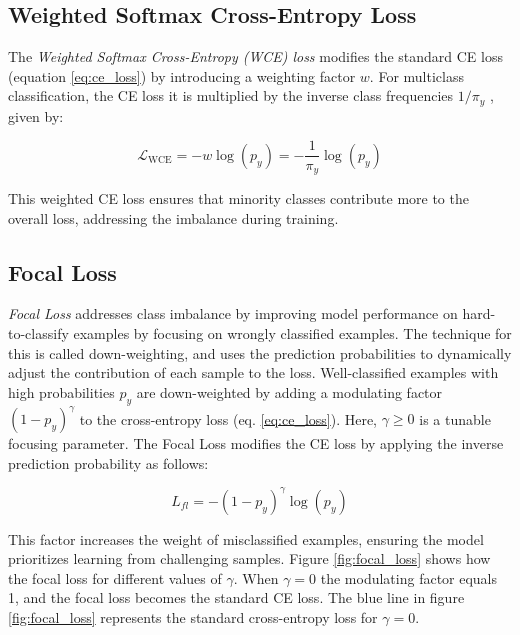 \subsection{Weighted Softmax Cross-Entropy Loss}
\label{sec:wce_loss}
The \emph{Weighted Softmax Cross-Entropy (WCE) loss} modifies the standard CE loss (equation \eqref{eq:ce_loss}) by introducing a weighting factor $w$. For multiclass classification, the CE loss it is multiplied by the inverse class frequencies $1/\pi_y$ \cite{zhang2023deep,lin2018focallossdenseobject}, given by:

\begin{equation}
    \label{eq:wce_loss}
    \mathcal{L}_{\text{WCE}} = -w \log(p_y) = - \frac{1}{\pi_y} \log(p_y)
\end{equation}

\noindent This weighted CE loss ensures that minority classes contribute more to the overall loss, addressing the imbalance during training.


\subsection{Focal Loss}
\label{sec:fl}
\emph{Focal Loss} \cite{lin2018focallossdenseobject} addresses class imbalance by improving model performance on hard-to-classify examples by focusing on wrongly classified examples. The technique for this is called down-weighting, and uses the prediction probabilities to dynamically adjust the contribution of each sample to the loss. Well-classified examples with high probabilities $p_y$ are down-weighted by adding a modulating factor $(1 - p_y)^\gamma$ to the cross-entropy loss (eq. \eqref{eq:ce_loss}). Here, $\gamma \geq 0$ is a tunable focusing parameter. The Focal Loss modifies the CE loss by applying the inverse prediction probability as follows:

\begin{equation}
    \label{eq:focal_loss}
    L_{fl} = -(1 - p_y)^\gamma \log(p_y)
\end{equation}

\noindent This factor increases the weight of misclassified examples, ensuring the model prioritizes learning from challenging samples. Figure \ref{fig:focal_loss} shows how the focal loss for different values of $\gamma$. When $\gamma = 0$ the modulating factor equals 1, and the focal loss becomes the standard CE loss. The blue line in figure \ref{fig:focal_loss} represents the standard cross-entropy loss for $\gamma = 0$.

